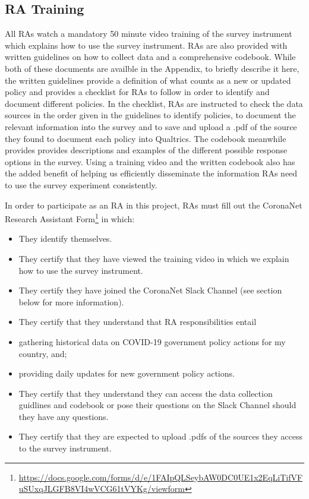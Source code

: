 \documentclass[
]{article}
\providecommand{\tightlist}{%
  \setlength{\itemsep}{0pt}\setlength{\parskip}{0pt}}
\begin{document}
\hypertarget{ra-training}{%
\subsection{RA Training}\label{ra-training}}

All RAs watch a mandatory 50 minute video training of the survey instrument which explains how to use the survey instrument. RAs are also provided with written guidelines on how to collect data and a comprehensive codebook. While both of these documents are availble in the Appendix, to briefly describe it here, the written guidelines provide a definition of what counts as a new or updated policy and provides a checklist for RAs to follow in order to identify and document different policies. In the checklist, RAs are instructed to check the data sources in the order given in the guidelines to identify policies, to document the relevant information into the survey and to save and upload a .pdf of the source they found to document each policy into Qualtrics. The codebook meanwhile provides provides descriptions and examples of the different possible response options in the survey. Using a training video and the written codebook also has the added benefit of helping us efficiently disseminate the information RAs need to use the survey experiment consistently.

In order to participate as an RA in this project, RAs must fill out the CoronaNet Research Assistant Form\footnote{\url{https://docs.google.com/forms/d/e/1FAIpQLSeybAW0DC0UE1x2EqLiTifVFuSUxqJLGFB8VI4wVCG61tVYKg/viewform}} in which:

\begin{itemize}
\tightlist
\item
  They identify themselves.
\item
  They certify that they have viewed the training video in which we explain how to use the survey instrument.
\item
  They certify they have joined the CoronaNet Slack Channel (see section below for more information).
\item
  They certify that they understand that RA responsibilities entail
\item
  gathering historical data on COVID-19 government policy actions for my country, and;
\item
  providing daily updates for new government policy actions.
\item
  They certify that they understand they can access the data collection guidlines and codebook or pose their questions on the Slack Channel should they have any questions.
\item
  They certify that they are expected to upload .pdfs of the sources they access to the survey instrument.
\end{itemize}
\end{document}
